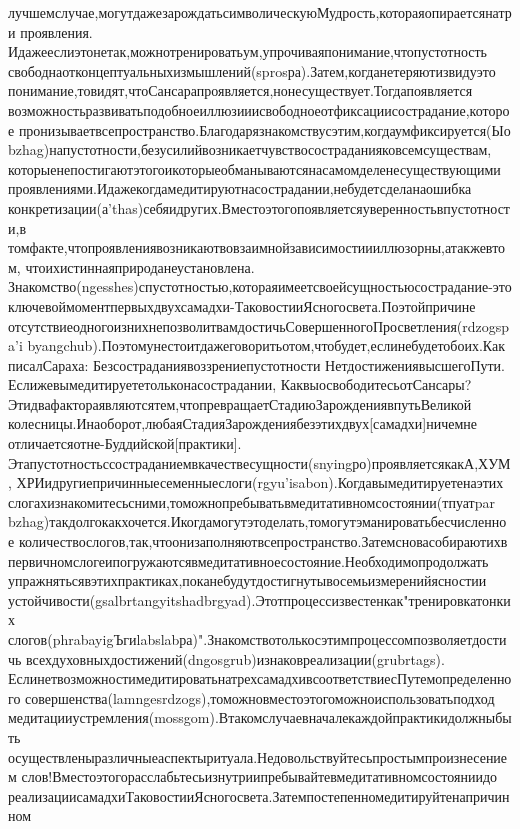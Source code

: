 {лучшемслучае,могутдажезарождатьсимволическуюМудрость,котораяопираетсянатри
проявления.
Идажееслиэтонетак,можнотренироватьум,упрочиваяпонимание,чтопустотность
свободнаотконцептуальныхизмышлений(sprosра).Затем,когданетеряютизвидуэто
понимание,товидят,чтоСансарапроявляется,нонесуществует.Тогдапоявляется
возможностьразвиватьподобноеиллюзииисвободноеотфиксациисострадание,которое
пронизываетвсепространство.Благодарязнакомствусэтим,когдаумфиксируется(Ыо
bzhag)напустотности,безусилийвозникаетчувствосостраданияковсемсуществам,
которыенепостигаютэтогоикоторыеобманываютсянасамомделенесуществующими
проявлениями.Идажекогдамедитируютнасострадании,небудетсделанаошибка
конкретизации(а'thas)себяидругих.Вместоэтогопоявляетсяуверенностьвпустотности,в
томфакте,чтопроявлениявозникаютвовзаимнойзависимостиииллюзорны,атакжевтом,
чтоихистиннаяприроданеустановлена.
Знакомство(ngesshes)спустотностью,котораяимеетсвоейсущностьюсострадание-это
ключевоймоментпервыхдвухсамадхи-ТаковостииЯсногосвета.Поэтойпричине
отсутствиеодногоизнихнепозволитвамдостичьСовершенногоПросветления(rdzogspa'i
byangchub).Поэтомунестоитдажеговоритьотом,чтобудет,еслинебудетобоих.Как
писалСараха:
Безсостраданиявоззрениепустотности
НетдостижениявысшегоПути.
Еслижевымедитируететольконасострадании,
КаквыосвободитесьотСансары?
Этидвафактораявляютсятем,чтопревращаетСтадиюЗарождениявпутьВеликой
колесницы.Инаоборот,любаяСтадияЗарождениябезэтихдвух[самадхи]ничемне
отличаетсяотне-Буддийской[практики].
Этапустотностьссостраданиемвкачествесущности(snyingро)проявляетсякакА,ХУМ,
ХРИидругиепричинныесеменныеслоги(rgyu'isabon).Когдавымедитируетенаэтих
слогахизнакомитесьсними,томожнопребыватьвмедитативномсостоянии(тпуатpar
bzhag)такдолгокакхочется.Икогдамогутэтоделать,томогутэманироватьбесчисленное
количествослогов,так,чтоонизаполняютвсепространство.Затемсновасобираютихв
первичномслогеипогружаютсявмедитативноесостояние.Необходимопродолжать
упражнятьсявэтихпрактиках,поканебудутдостигнутывосемьизмеренийясностии
устойчивости(gsalbrtangyitshadbrgyad).Этотпроцессизвестенкак"тренировкатонких
слогов(phrabayigЪгиlabslabра)".Знакомствотолькосэтимпроцессомпозволяетдостичь
всехдуховныхдостижений(dngosgrub)изнаковреализации(grubrtags).
ЕслинетвозможностимедитироватьнатрехсамадхивсоответствиесПутемопределенного
совершенства(lamngesrdzogs),томожновместоэтогоможноиспользоватьподход
медитацииустремления(mossgom).Втакомслучаевначалекаждойпрактикидолжныбыть
осуществленыразличныеаспектыритуала.Недовольствуйтесьпростымпроизнесением
слов!Вместоэтогорасслабьтесьизнутриипребывайтевмедитативномсостояниидо
реализациисамадхиТаковостииЯсногосвета.Затемпостепенномедитируйтенапричинном
}
